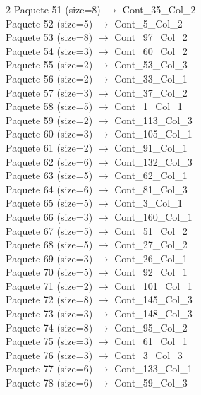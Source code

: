 \begin{multicols}{2}
Paquete 51 (size=8) $\rightarrow$ Cont\_35\_Col\_2\\
Paquete 52 (size=5) $\rightarrow$ Cont\_5\_Col\_2\\
Paquete 53 (size=8) $\rightarrow$ Cont\_97\_Col\_2\\
Paquete 54 (size=3) $\rightarrow$ Cont\_60\_Col\_2\\
Paquete 55 (size=2) $\rightarrow$ Cont\_53\_Col\_3\\
Paquete 56 (size=2) $\rightarrow$ Cont\_33\_Col\_1\\
Paquete 57 (size=3) $\rightarrow$ Cont\_37\_Col\_2\\
Paquete 58 (size=5) $\rightarrow$ Cont\_1\_Col\_1\\
Paquete 59 (size=2) $\rightarrow$ Cont\_113\_Col\_3\\
Paquete 60 (size=3) $\rightarrow$ Cont\_105\_Col\_1\\
Paquete 61 (size=2) $\rightarrow$ Cont\_91\_Col\_1\\
Paquete 62 (size=6) $\rightarrow$ Cont\_132\_Col\_3\\
Paquete 63 (size=5) $\rightarrow$ Cont\_62\_Col\_1\\
Paquete 64 (size=6) $\rightarrow$ Cont\_81\_Col\_3\\
Paquete 65 (size=5) $\rightarrow$ Cont\_3\_Col\_1\\
Paquete 66 (size=3) $\rightarrow$ Cont\_160\_Col\_1\\
Paquete 67 (size=5) $\rightarrow$ Cont\_51\_Col\_2\\
Paquete 68 (size=5) $\rightarrow$ Cont\_27\_Col\_2\\
Paquete 69 (size=3) $\rightarrow$ Cont\_26\_Col\_1\\
Paquete 70 (size=5) $\rightarrow$ Cont\_92\_Col\_1\\
Paquete 71 (size=2) $\rightarrow$ Cont\_101\_Col\_1\\
Paquete 72 (size=8) $\rightarrow$ Cont\_145\_Col\_3\\
Paquete 73 (size=3) $\rightarrow$ Cont\_148\_Col\_3\\
Paquete 74 (size=8) $\rightarrow$ Cont\_95\_Col\_2\\
Paquete 75 (size=3) $\rightarrow$ Cont\_61\_Col\_1\\
Paquete 76 (size=3) $\rightarrow$ Cont\_3\_Col\_3\\
Paquete 77 (size=6) $\rightarrow$ Cont\_133\_Col\_1\\
Paquete 78 (size=6) $\rightarrow$ Cont\_59\_Col\_3\\

\end{multicols}
